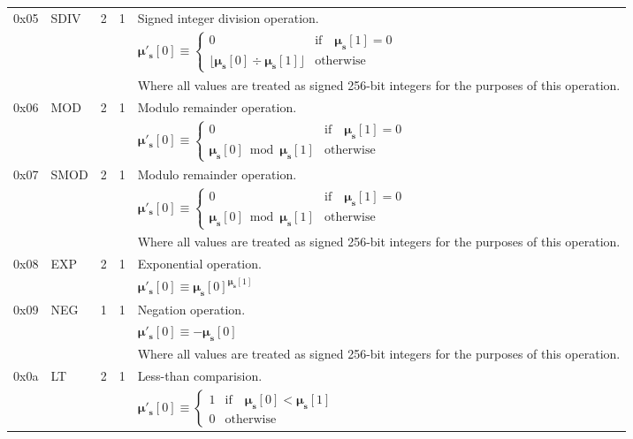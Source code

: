 \documentclass[9pt,oneside]{amsart}
\begin{document}
\begin{tabular*}{\columnwidth}[h]{rlrrl}
\midrule
0x05 & {\small SDIV} & 2 & 1 & Signed integer division operation. \\
&&&& $\boldsymbol{\mu}'_\mathbf{s}[0] \equiv \begin{cases}0 & \text{if} \quad \boldsymbol{\mu}_\mathbf{s}[1] = 0\\ \lfloor\boldsymbol{\mu}_\mathbf{s}[0] \div \boldsymbol{\mu}_\mathbf{s}[1]\rfloor & \text{otherwise}\end{cases}$  \\
&&&& Where all values are treated as signed 256-bit integers for the purposes of this operation. \\
\midrule
0x06 & {\small MOD} & 2 & 1 & Modulo remainder operation. \\
&&&& $\boldsymbol{\mu}'_\mathbf{s}[0] \equiv \begin{cases}0 & \text{if} \quad \boldsymbol{\mu}_\mathbf{s}[1] = 0\\ \boldsymbol{\mu}_\mathbf{s}[0] \bmod \boldsymbol{\mu}_\mathbf{s}[1] & \text{otherwise}\end{cases}$  \\
\midrule
0x07 & {\small SMOD} & 2 & 1 & Modulo remainder operation. \\
&&&& $\boldsymbol{\mu}'_\mathbf{s}[0] \equiv \begin{cases}0 & \text{if} \quad \boldsymbol{\mu}_\mathbf{s}[1] = 0\\ \boldsymbol{\mu}_\mathbf{s}[0] \bmod \boldsymbol{\mu}_\mathbf{s}[1] & \text{otherwise}\end{cases}$  \\
&&&& Where all values are treated as signed 256-bit integers for the purposes of this operation. \\
\midrule
0x08 & {\small EXP} & 2 & 1 & Exponential operation. \\
&&&& $\boldsymbol{\mu}'_\mathbf{s}[0] \equiv \boldsymbol{\mu}_\mathbf{s}[0] ^ {\boldsymbol{\mu}_\mathbf{s}[1] }$ \\
\midrule
0x09 & {\small NEG} & 1 & 1 & Negation operation. \\
&&&& $\boldsymbol{\mu}'_\mathbf{s}[0] \equiv -\boldsymbol{\mu}_\mathbf{s}[0]$ \\
&&&& Where all values are treated as signed 256-bit integers for the purposes of this operation. \\
\midrule
0x0a & {\small LT} & 2 & 1 & Less-than comparision. \\
&&&& $\boldsymbol{\mu}'_\mathbf{s}[0] \equiv \begin{cases} 1 & \text{if} \quad \boldsymbol{\mu}_\mathbf{s}[0] < \boldsymbol{\mu}_\mathbf{s}[1] \\ 0 & \text{otherwise} \end{cases}$ \\

\end{tabular*}
\end{document}
